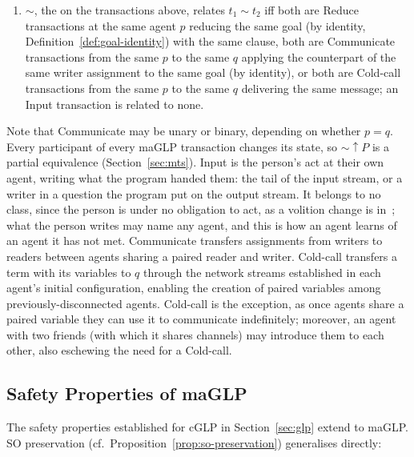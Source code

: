 \begin{definition}
\begin{enumerate}
    \item ${\sim}$, the  on the transactions above, relates $t_1 \sim t_2$ iff both are Reduce transactions at the same agent $p$ reducing the same goal (by identity, Definition~\ref{def:goal-identity}) with the same clause, both are Communicate transactions from the same $p$ to the same $q$ applying the counterpart of the same writer assignment to the same goal (by identity), or both are Cold-call transactions from the same $p$ to the same $q$ delivering the same message; an Input transaction is related to none.
\end{enumerate}
\end{definition}

Note that Communicate may be unary or binary, depending on whether $p=q$.  Every participant of every maGLP transaction changes its state, so ${\sim}{\uparrow}P$ is a partial equivalence (Section~\ref{sec:mts}).  Input is the person's act at their own agent, writing what the program handed them: the tail of the input stream, or a writer in a question the program put on the output stream.  It belongs to no class, since the person is under no obligation to act, as a volition change is in~\cite{lewis2026volitional}; what the person writes may name any agent, and this is how an agent learns of an agent it has not met.  Communicate transfers assignments from writers to readers between agents sharing a paired reader and writer.  Cold-call transfers a term with its variables to $q$ through the network streams established in each agent's initial configuration, enabling the creation of paired variables among previously-disconnected agents.
Cold-call is the exception, as once agents share a paired variable they can use it to communicate indefinitely; moreover, an agent with two friends (with which it shares channels) may introduce them to each other, also eschewing the need for a Cold-call.

\subsection{Safety Properties of maGLP}
\label{sec:maglp-safety}

The safety properties established for cGLP in Section~\ref{sec:glp} extend to maGLP. SO preservation (cf.\ Proposition~\ref{prop:so-preservation}) generalises directly:

